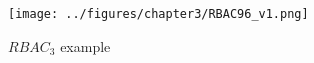 \documentclass[twoside, openright, 12pt]{book}
\begin{document}
\begin{figure}[htb]
	\centering
	\texttt{[image: ../figures/chapter3/RBAC96\_v1.png]}
	\caption{$RBAC_3$ example}
	\label{fig:RBAC96_example}
\end{figure}



\cleardoublepage
\DeclareRobustCommand{\citeext}[1]{\citeauthor{#1}~\cite{#1}}




\end{document}
